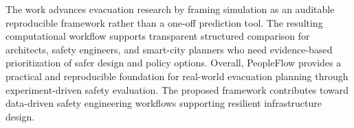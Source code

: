 \documentclass[journal]{IEEEtran}
\begin{document}
The work advances evacuation research by framing simulation as an auditable reproducible framework rather than a one-off prediction tool. The resulting computational workflow supports transparent structured comparison for architects, safety engineers, and smart-city planners who need evidence-based prioritization of safer design and policy options. Overall, PeopleFlow provides a practical and reproducible foundation for real-world evacuation planning through experiment-driven safety evaluation.
The proposed framework contributes toward data-driven safety engineering workflows supporting resilient infrastructure design.

\FloatBarrier
\clearpage
\balance


\end{document}
